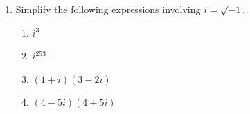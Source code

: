 \documentclass[12pt]{article}
\theoremstyle{plain}     %
\begin{document}
\begin{enumerate}
	\item \hspace{-2em}\llap{$*$}\hspace{2em}Simplify the following expressions involving $i=\sqrt{-1}$. 
		\begin{enumerate}
			\item $i^3$\\
			\item $i^{253}$\\
			\item $(1+i)(3-2i)$\\
			\item $(4-5i)(4+5i)$\\
		\end{enumerate}
\end{enumerate}
	
\end{document}
